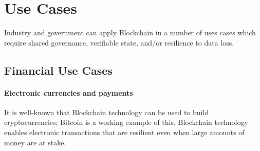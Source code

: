 
\section{Use Cases}
\label{sec:use-cases}

Industry and government can apply Blockchain in a number of uses cases which 
require shared governance, verifiable state, and/or resilience to data loss. 


\subsection{Financial Use Cases}

\paragraph{Electronic currencies and payments}


It is well-known that Blockchain technology can be used to build cryptocurrencies; Bitcoin is a working example of this.
Blockchain technology enables electronic transactions that are resilient even 
when large amounts of money are at stake.


